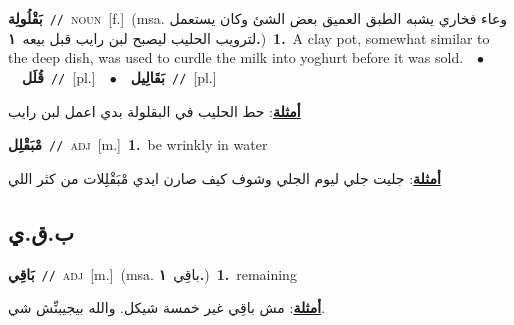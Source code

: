 \documentclass[10pt,a4paper,twoside]{article} %
\begin{document}
\begin{multicols}{2}
{\setlength\topsep{0pt}\textbf{\foreignlanguage{arabic}{بَقْلُولِة}}\ {\color{gray}\texttt{//}\color{black}}\ \textsc{noun}\ [f.]\ \color{gray}(msa. \foreignlanguage{arabic}{وعاء فخاري يشبه الطبق العميق بعض الشئ وكان يستعمل لترويب الحليب ليصبح لبن رايب قبل بيعه}~\foreignlanguage{arabic}{\textbf{١.}})\color{black}\ \textbf{1.}~A clay pot, somewhat similar to the deep dish, was used to curdle the milk into yoghurt before it was sold.\ \ $\bullet$\ \ \setlength\topsep{0pt}\textbf{\foreignlanguage{arabic}{قُلَل}}\ {\color{gray}\texttt{//}\color{black}}\ [pl.]\ \ $\bullet$\ \ \setlength\topsep{0pt}\textbf{\foreignlanguage{arabic}{بَقَالِيل}}\ {\color{gray}\texttt{//}\color{black}}\ [pl.]\  \begin{flushright}\color{gray}\foreignlanguage{arabic}{\textbf{\underline{\foreignlanguage{arabic}{أمثلة}}}: حط الحليب في البقلولة بدي اعمل لبن رايب}\end{flushright}\color{black}} \vspace{2mm}

{\setlength\topsep{0pt}\textbf{\foreignlanguage{arabic}{مْبَقْلِل}}\ {\color{gray}\texttt{//}\color{black}}\ \textsc{adj}\ [m.]\ \textbf{1.}~be wrinkly in water\  \begin{flushright}\color{gray}\foreignlanguage{arabic}{\textbf{\underline{\foreignlanguage{arabic}{أمثلة}}}: جليت جلي ليوم الجلي وشوف كيف صارن ايدي مْبَقْلِلات من كثر اللي}\end{flushright}\color{black}} \vspace{2mm}

\vspace{-3mm}
\subsection*{\color{blue}\foreignlanguage{arabic}{ب.ق.ي}\color{blue}{}} 

{\setlength\topsep{0pt}\textbf{\foreignlanguage{arabic}{بَاقِي}}\ {\color{gray}\texttt{//}\color{black}}\ \textsc{adj}\ [m.]\ \color{gray}(msa. \foreignlanguage{arabic}{باقِي}~\foreignlanguage{arabic}{\textbf{١.}})\color{black}\ \textbf{1.}~remaining\  \begin{flushright}\color{gray}\foreignlanguage{arabic}{\textbf{\underline{\foreignlanguage{arabic}{أمثلة}}}: مش باقِي غير خمسة شيكل. والله بيجيبنِّش شي.}\end{flushright}\color{black}} \vspace{2mm}


\end{multicols}
\end{document}

